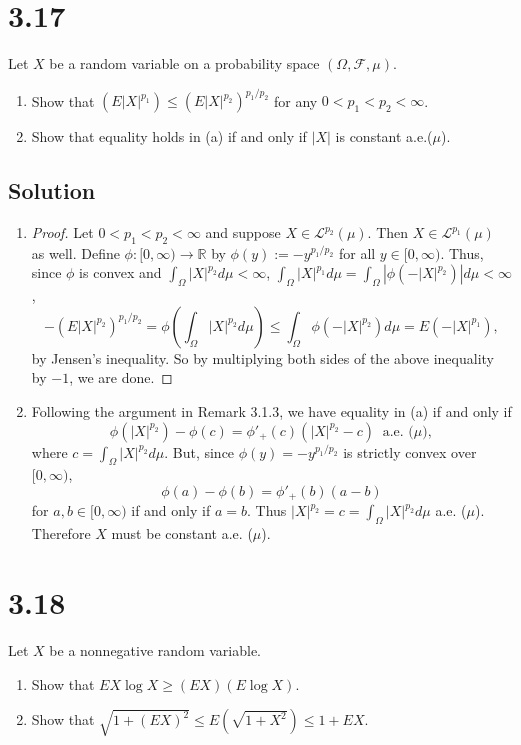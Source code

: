 \documentclass[12pt]{article}
\begin{document}
\newpage 
\section*{3.17}
Let $X$ be a random variable on a probability space $(\Omega, \mathcal{F}, \mu)$.
\begin{enumerate}[label=(\alph*)]
\item Show that $(E|X|^{p_{1}}) \leq (E|X|^{p_{2}})^{p_{1}/p_{2}}$ for any $0 < p_{1} < p_{2} < \infty$.
\item Show that equality holds in (a) if and only if $|X|$ is constant a.e.($\mu$).
\end{enumerate}

\subsection*{Solution}
\begin{enumerate}[label=(\alph*)]
\item 
\begin{proof}
Let $0 < p_{1} < p_{2} < \infty$ and suppose $X \in \mathcal{L}^{p_{2}}(\mu)$. Then $X \in \mathcal{L}^{p_{1}}(\mu)$ as well. 
Define $\phi : [0,\infty) \rightarrow \mathbb{R}$ by 
$\phi(y) := -y^{p_{1}/p_{2}}$ for all $y \in [0,\infty)$. Thus, since $\phi$ is convex and $\int_{\Omega}|X|^{p_{2}}d\mu < \infty$, 
$\int_{\Omega}|X|^{p_{1}}d\mu  = \int_{\Omega}|\phi(-|X|^{p_{2}})|d\mu < \infty$,
\[ -\left(E|X|^{p_{2}}\right)^{p_{1}/p_{2}} = \phi\left( \int_{\Omega}|X|^{p_{2}}d\mu \right) \leq \int_{\Omega}\phi\left(-|X|^{p_{2}} \right)d\mu = 
E\left( -|X|^{p_{1}} \right), \]
by Jensen's inequality. So by multiplying both sides of the above inequality by $-1$, we are done.
\end{proof}

\vspace{8mm}
\item Following the argument in Remark 3.1.3, we have equality in (a) if and only if 
\[ \phi(|X|^{p_{2}}) - \phi(c) = \phi'_{+}(c)(|X|^{p_{2}} - c) \ \text{ a.e. ($\mu$)}, \]
where $c = \int_{\Omega}|X|^{p_{2}}d\mu$. But, since $\phi(y) = -y^{p_{1}/p_{2}}$ is strictly convex over $[0,\infty)$,
\[ \phi(a) - \phi(b) = \phi'_{+}(b)(a - b) \]
for $a,b \in [0,\infty)$ if and only if $a = b$. Thus $|X|^{p_{2}} = c = \int_{\Omega}|X|^{p_{2}}d\mu$ a.e. ($\mu$). Therefore $X$ must be constant
a.e. ($\mu$).

\end{enumerate}


\newpage 
\section*{3.18}
Let $X$ be a nonnegative random variable.
\begin{enumerate}[label=(\alph*)]
\item Show that $EX\log X \geq (EX)(E\log X)$.
\item Show that $\sqrt{1 + (EX)^{2}} \leq E(\sqrt{1 + X^{2}}) \leq 1 + EX$.
\end{enumerate}
\end{document}
